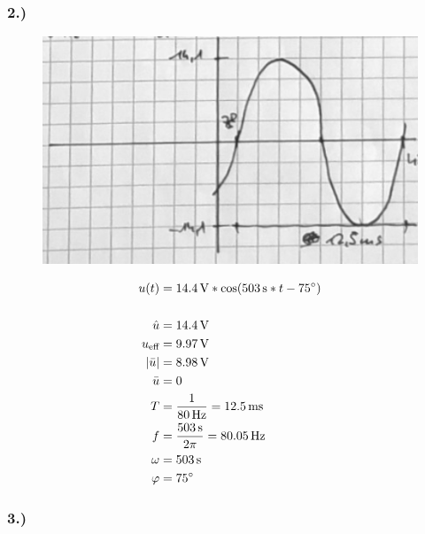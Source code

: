 \documentclass[../../document.tex]{subfiles}
\begin{document}
\newpage

\subsubsection*{2.)}

\begin{figure}[H]
    \begin{center}
        \includegraphics[width=.9\linewidth]{../../img/aufg1-a-2}
    \end{center}
\end{figure}

\begin{equation*}
    \begin{split}
        u(t) &= \SI{14,4}{\volt} * \cos(\SI{503}{\second} * t - \SI{75}{\degree})\\\\
        \hat{u} &= \SI{14,4}{\volt}\\
        u_{\textrm{eff}} &= \SI{9,97}{\volt}\\
        \left\lvert\bar{u}\right\rvert &= \SI{8,98}{\volt}\\
        \bar{u} &= 0\\
        T &= \frac{1}{\SI{80}{\hertz}} = \SI{12,5}{ms}\\
        f &= \frac{\SI{503}{\second}}{2\pi} = \SI{80,05}{\hertz}\\
        \omega &= \SI{503}{\second}\\
        \varphi &= \SI{75}{\degree}\\
    \end{split}
\end{equation*}

\newpage

\subsubsection*{3.)}
\end{document}
